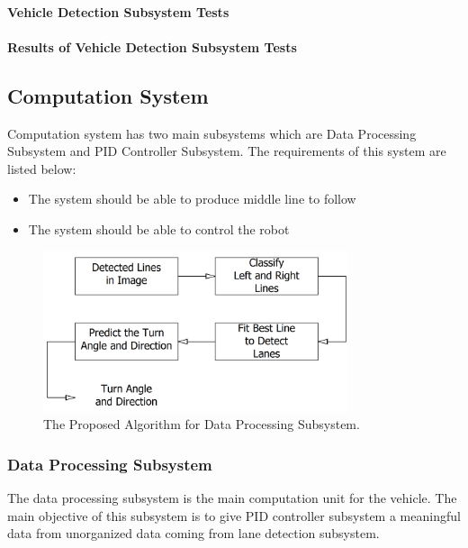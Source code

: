 \documentclass[a4paper,12pt]{article}
\begin{document}
	\paragraph{Vehicle Detection Subsystem Tests}	
	
	\paragraph{Results of Vehicle Detection Subsystem Tests}
	\subsection{Computation System}
	
	Computation system has two main subsystems which are Data Processing Subsystem and PID Controller Subsystem. The requirements of this system are listed below:
	\begin{itemize}
		\item The system should	be able to produce middle line to follow
		\item The system should be able to control the robot
	\end{itemize}	
	
		\begin{figure}[t]
		\center
		\setlength{\unitlength}{\textwidth} 
		\includegraphics[width=0.8\textwidth]{v-models/data_processing_subsystem}
		\caption{\label{fig:data_processing_subsystem}The Proposed Algorithm for Data Processing Subsystem.}
	\end{figure}
	\subsubsection{Data Processing Subsystem}
	
		The data processing subsystem is the main computation unit for the vehicle. The main objective of this subsystem is to give PID controller subsystem a meaningful data from unorganized data coming from lane detection subsystem. 
	
\end{document}
